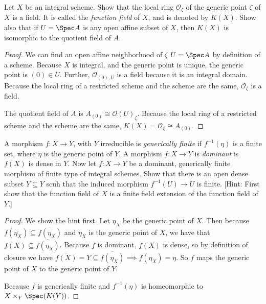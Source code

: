 \begin{exercise}%
	Let $X $ be an integral scheme. Show that the local ring $\mathcal{O}_{\zeta} $ of the generic point $\zeta  $ of $X $ is a field. It is called the \textit{function field} of $X $, and is denoted by $K(X) $. Show also that if $U = \Spec A $ is any open affine subset of $X $, then $K(X) $ is isomorphic to the quotient field of $A $.
\end{exercise}
\begin{proof}
	We can find an open affine neighborhood of $\zeta  $ $U = \Spec A $ by definition of a scheme.
	Because $X $ is integral, and the generic point is unique, the generic point is $(0) \in U $.
	Further, $\mathcal{O}_{(0),U} $ is a field because it is an integral domain.
	Because the local ring of a restricted scheme and the scheme are the same, $\mathcal{O}_{\zeta } $ is a field.

	The quotient field of $A $ is $A_{(0)} \cong \mathcal{O}(U)_{\zeta} $.
	Because the local ring of a restricted scheme and the scheme are the same, $K(X) = \mathcal{O}_{\zeta }\cong A_{(0)} $.
\end{proof}

\begin{exercise}%
	A morphism $f: X\to Y $, with $Y $ irreducible is \textit{generically finite} if $f^{-1}(\eta ) $ is a finite set, where $\eta  $ is the generic point of $Y $. A morphism $f: X\to Y $ is \textit{dominant} is $f(X) $ is dense in $Y $. Now let $f: X\to Y $ be a dominant, generically finite morphism of finite type of integral schemes. Show that there is an open dense subset $Y \subseteq Y $ scuh that the induced morphism $f^{-1}(U) \to U $ is finite.
	[Hint: First show that the function field of $X $ is a finite field extension of the function field of $Y $.]
\end{exercise}
\begin{proof}
	We show the hint first.
	Let $\eta _X $ be the generic point of $X $.
	Then because $f(\overline{\eta _X}) \subseteq \overline{f(\eta _X)}   $ and $\eta _X $ is the generic point of $X $, we have that $f(X) \subseteq \overline{f(\eta_X)}  $.
	Because $f  $ is dominant, $f(X) $ is dense, so by definition of closure we have $\overline{f(X)} = Y \subseteq \overline{f(\eta _X)} \implies f(\eta_X) = \eta$.
	So $f $ maps the generic point of $X $ to the generic point of $Y $.

	Because $f $ is generically finite and $f^{-1}(\eta ) $ is homeomorphic to $X \times_Y \Spec(K(Y)) $.
\end{proof}

